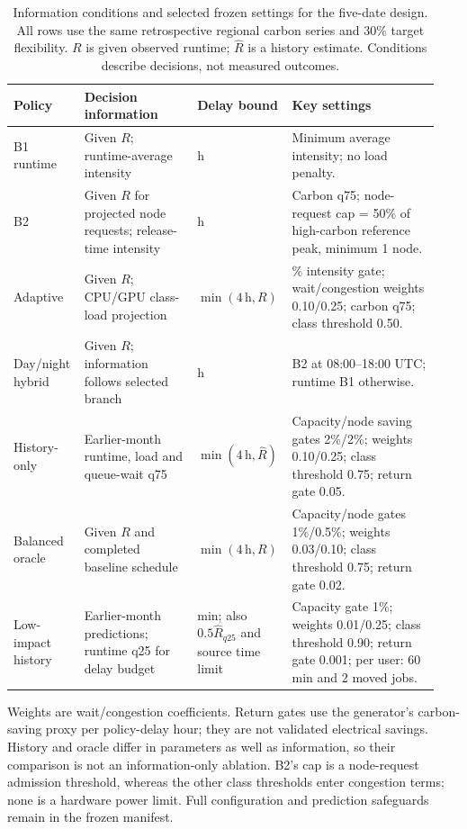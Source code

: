 \begin{table}[htbp]
\centering
\small
\setlength{\tabcolsep}{4pt}
\renewcommand{\arraystretch}{1.16}
\caption[Frozen policy information and key parameters]{Information conditions and selected frozen settings for the five-date design. All rows use the same retrospective regional carbon series and 30\% target flexibility. $R$ is given observed runtime; $\widehat R$ is a history estimate. Conditions describe decisions, not measured outcomes.}
\label{tab:frozen-policy-information}
\begin{tabular}{@{}>{\raggedright\arraybackslash}p{0.15\linewidth}>{\raggedright\arraybackslash}p{0.265\linewidth}>{\raggedright\arraybackslash}p{0.18\linewidth}>{\raggedright\arraybackslash}p{0.34\linewidth}@{}}
\toprule
Policy & Decision information & Delay bound & Key settings \\
\midrule
B1 runtime & Given $R$; runtime-average intensity & 4 h & Minimum average intensity; no load penalty. \\
B2 & Given $R$ for projected node requests; release-time intensity & 4 h & Carbon q75; node-request cap = 50\% of high-carbon reference peak, minimum 1 node. \\
Adaptive & Given $R$; CPU/GPU class-load projection & $\min(4\,\mathrm{h},R)$ & 2\% intensity gate; wait/congestion weights 0.10/0.25; carbon q75; class threshold 0.50. \\
Day/night hybrid & Given $R$; information follows selected branch & 4 h & B2 at 08:00--18:00 UTC; runtime B1 otherwise. \\
History-only & Earlier-month runtime, load and queue-wait q75 & $\min(4\,\mathrm{h},\widehat R)$ & Capacity/node saving gates 2\%/2\%; weights 0.10/0.25; class threshold 0.75; return gate 0.05. \\
Balanced oracle & Given $R$ and completed baseline schedule & $\min(4\,\mathrm{h},R)$ & Capacity/node gates 1\%/0.5\%; weights 0.03/0.10; class threshold 0.75; return gate 0.02. \\
Low-impact history & Earlier-month predictions; runtime q25 for delay budget & 60 min; also $0.5\widehat R_{q25}$ and source time limit & Capacity gate 1\%; weights 0.01/0.25; class threshold 0.90; return gate 0.001; per user: 60 min and 2 moved jobs. \\
\bottomrule
\end{tabular}
\par\smallskip
\begin{minipage}{\linewidth}\footnotesize
Weights are wait/congestion coefficients. Return gates use the generator's carbon-saving proxy per policy-delay hour; they are not validated electrical savings. History and oracle differ in parameters as well as information, so their comparison is not an information-only ablation. B2's cap is a node-request admission threshold, whereas the other class thresholds enter congestion terms; none is a hardware power limit. Full configuration and prediction safeguards remain in the frozen manifest.
\end{minipage}
\end{table}
